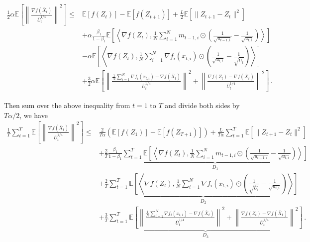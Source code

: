 \documentclass[11pt]{article}
\begin{document}
\begin{align}
\frac{1}{2} \alpha \mathbb E \left [\left\|\frac{\nabla f( \overline X_{t})}{\overline U_{t}^{1/4}}\right\|^2  \right]
\leq & \mathbb E  [f( Z_{t})]  -  \mathbb E [f( Z_{t+1})] + \frac{L}{2} \mathbb E\left[\| Z_{t+1}-  Z_{t}\|^2 \right] \nonumber  \\
&+ \alpha \frac{\beta_1}{1-\beta_1}  \mathbb E \left [\left \langle \nabla f( Z_{t}) , \frac{1}{N} \sum_{i=1}^N m_{t-1	,i} \odot (\frac{1}{\sqrt{u_{t-1,i}}} - \frac{1}{\sqrt{u_{t,i}}}) \right \rangle \right] \nonumber \\
& - \alpha \mathbb E \left [ \left \langle \nabla f( Z_{t}), \frac{1}{N} \sum_{i=1}^N \nabla f_i( x_{t,i})\odot \left(\frac{1}{\sqrt{u_{t,i}}} - \frac{1}{\sqrt{\overline U_{t}}}  \right)  \right \rangle \right] \nonumber \\
& + \frac{3}{2} \alpha \mathbb E \left [ \left\|  \frac{ \frac{1}{N}\sum_{i=1}^N \nabla f_i( x_{t,i}) -  \nabla f( \overline X_{t})}{\overline U_{t}^{1/4}}  \right\|^2 + \left\|\frac{\nabla f( Z_{t}) -\nabla f( \overline X_{t})}{\overline U_{t}^{1/4}}\right\|^2 \right] \, . \nonumber
\end{align}



Then sum over the above inequality from $t= 1$ to $T$ and divide both sides by $T\alpha/2$, we have
\begin{align}\label{eq: exp_telescope}
 \frac{1}{T}\sum_{t=1}^T  \mathbb E \left [\left\|\frac{\nabla f( \overline X_{t})}{\overline U_{t}^{1/4}}\right\|^2  \right]
\leq & \frac{2}{T\alpha} ( \mathbb E  [f( Z_{1})]  -  \mathbb E [f( Z_{T+1})]) + \frac{L}{T\alpha} \sum_{t=1}^T\mathbb E\left[\| Z_{t+1}-  Z_{t}\|^2 \right] \nonumber   \\
&+ \frac{2}{T}\frac{\beta_1}{1-\beta_1} \underbrace{\sum_{t=1}^T   \mathbb E \left [\left \langle \nabla f( Z_{t}) , \frac{1}{N} \sum_{i=1}^N m_{t-1	,i} \odot (\frac{1}{\sqrt{u_{t-1,i}}} - \frac{1}{\sqrt{u_{t,i}}}) \right \rangle \right]}_{D_1} \nonumber  \\
& + \frac{2}{T} \underbrace{\sum_{t=1}^T \mathbb E \left [ \left \langle \nabla f( Z_{t}), \frac{1}{N} \sum_{i=1}^N \nabla f_i( x_{t,i})\odot \left( \frac{1}{\sqrt{\overline U_{t}}} -\frac{1}{\sqrt{u_{t,i}}}  \right)  \right \rangle \right] }_{D_2} \nonumber  \\
& + \frac{3}{T} \underbrace{\sum_{t=1}^T \mathbb E \left [ \left\|  \frac{ \frac{1}{N}\sum_{i=1}^N \nabla f_i( x_{t,i}) -  \nabla f( \overline X_{t})}{\overline U_{t}^{1/4}}  \right\|^2 + \left\|\frac{\nabla f( Z_{t}) -\nabla f( \overline X_{t})}{\overline U_{t}^{1/4}}\right\|^2 \right]}_{D_3} \, . 
\end{align}
\end{document}
